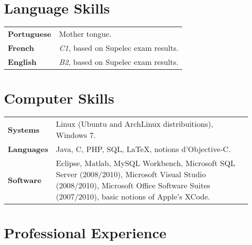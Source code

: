 \documentclass[10pt, a4paper]{article}
\begin{document}



\section{Language Skills}

\begin{tabular}{p{} p{}}

\textbf{Portuguese} & Mother tongue.  \\ 

 
\textbf{French} & \textit{C1}, based on Supelec exam results. \\ 


\textbf{English} & \textit{B2}, based on Supelec exam results. \\ 

\end{tabular}


\section{Computer Skills}

\begin{tabular}{p{} p{}}

 \textbf{Systems} & Linux (Ubuntu and ArchLinux distribuitions),
 Windows 7.
 \\

 \textbf{Languages} & Java, C, PHP,  SQL, \LaTeX, notions d’Objective-C. \\ 
 
 \textbf{Software} & Eclipse, Matlab, MySQL Workbench,  Microsoft SQL Server
 (2008/2010), Microsoft Visual Studio (2008/2010),  Microsoft Office Software
 Suites (2007/2010), basic notions of Apple’s XCode. \\
\end{tabular}


\section{Professional Experience}
\end{document}
